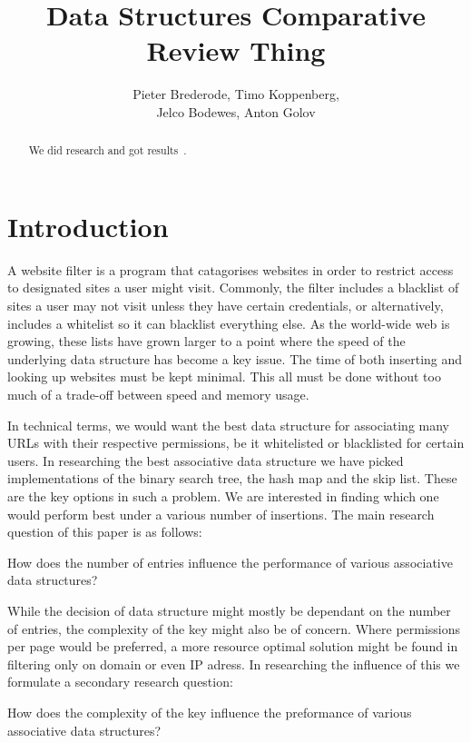 \documentclass[12pt,a4paper]{article}
\title{Data Structures Comparative Review Thing}
\author{Pieter Brederode, Timo Koppenberg, \\ Jelco Bodewes, Anton Golov}
\begin{document}
    \maketitle

    \begin{abstract}
        We did research and got results~\cite{CallOfCthulhu}.
    \end{abstract}


    \section{Introduction}
    A website filter is a program that catagorises websites in order to restrict access to designated
    sites a user might visit. Commonly, the filter includes a blacklist of sites a user may not visit
    unless they have certain credentials, or alternatively, includes a whitelist so it can blacklist
    everything else. As the world-wide web is growing, these lists have grown larger to a point where
    the speed of the underlying data structure has become a key issue. The time of both inserting and
    looking up websites must be kept minimal. This all must be done without too much of a trade-off
    between speed and memory usage.
    
    In technical terms, we would want the best data structure for associating many URLs with their
    respective permissions, be it whitelisted or blacklisted for certain users. In researching the best
    associative data structure we have picked implementations of the binary search tree, the hash map
    and the skip list. These are the key options in such a problem. We are interested in finding which
    one would perform best under a various number of insertions. The main research question of this paper
    is as follows:
    
    How does the number of entries influence the performance of various associative data structures?
    
    While the decision of data structure might mostly be dependant on the number of entries, the complexity
    of the key might also be of concern. Where permissions per page would be preferred, a more
    resource optimal solution might be found in filtering only on domain or even IP adress.
    In researching the influence of this we formulate a secondary research question:
    
    How does the complexity of the key influence the preformance of various associative data structures?
    
\end{document}
